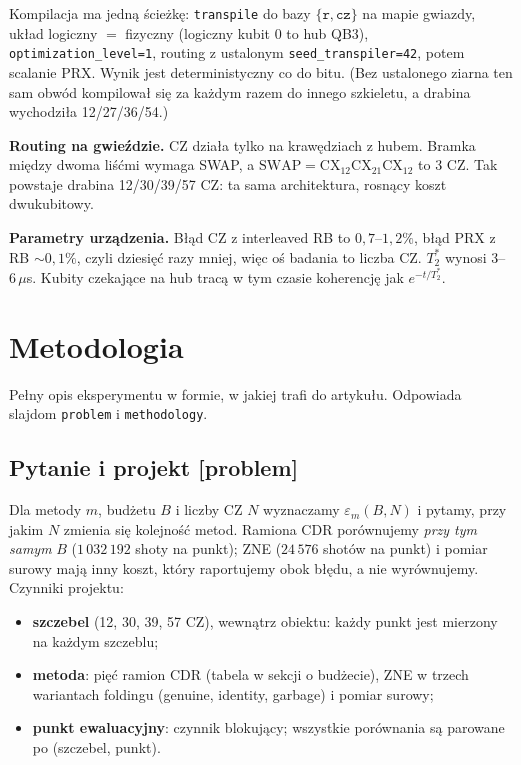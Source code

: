 \documentclass[11pt,a4paper]{article}
\newcommand{\slid}[1]{\hfill{\normalfont\small\ttfamily\color{axbluedk}[#1]}}
\begin{document}
Kompilacja ma jedną ścieżkę: \texttt{transpile} do bazy $\{\texttt{r},\texttt{cz}\}$ na mapie
gwiazdy, układ logiczny $=$ fizyczny (logiczny kubit 0 to hub QB3), \texttt{optimization\_level=1},
routing z ustalonym \texttt{seed\_transpiler=42}, potem scalanie PRX. Wynik jest deterministyczny
co do bitu. (Bez ustalonego ziarna ten sam obwód kompilował się za każdym razem do innego
szkieletu, a drabina wychodziła 12/27/36/54.)

\textbf{Routing na gwieździe.} CZ działa tylko na krawędziach z hubem. Bramka między dwoma liśćmi
wymaga SWAP, a $\mathrm{SWAP}=\mathrm{CX}_{12}\mathrm{CX}_{21}\mathrm{CX}_{12}$ to 3 CZ. Tak powstaje
drabina 12/30/39/57 CZ: ta sama architektura, rosnący koszt dwukubitowy.

\textbf{Parametry urządzenia.} Błąd CZ z interleaved RB to $0{,}7$--$1{,}2\%$, błąd PRX z RB
$\sim0{,}1\%$, czyli dziesięć razy mniej, więc oś badania to liczba CZ. $T_2^*$ wynosi 3--6\,$\mu$s.
Kubity czekające na hub tracą w tym czasie koherencję jak $e^{-t/T_2^*}$.

\section{Metodologia}

Pełny opis eksperymentu w formie, w jakiej trafi do artykułu. Odpowiada slajdom \texttt{problem}
i \texttt{methodology}.

\subsection{Pytanie i projekt \slid{problem}}

Dla metody $m$, budżetu $B$ i liczby CZ $N$ wyznaczamy $\varepsilon_m(B,N)$ i pytamy, przy jakim
$N$ zmienia się kolejność metod. Ramiona CDR porównujemy \emph{przy tym samym} $B$
($1\,032\,192$ shoty na punkt); ZNE ($24\,576$ shotów na punkt) i pomiar surowy mają inny koszt, który
raportujemy obok błędu, a nie wyrównujemy. Czynniki projektu:
\begin{itemize}
  \item \textbf{szczebel} (12, 30, 39, 57 CZ), wewnątrz obiektu: każdy punkt jest mierzony na
  każdym szczeblu;
  \item \textbf{metoda}: pięć ramion CDR (tabela w sekcji o budżecie), ZNE w trzech wariantach
  foldingu (genuine, identity, garbage) i pomiar surowy;
  \item \textbf{punkt ewaluacyjny}: czynnik blokujący; wszystkie porównania są parowane po
  (szczebel, punkt).
\end{itemize}
\end{document}
